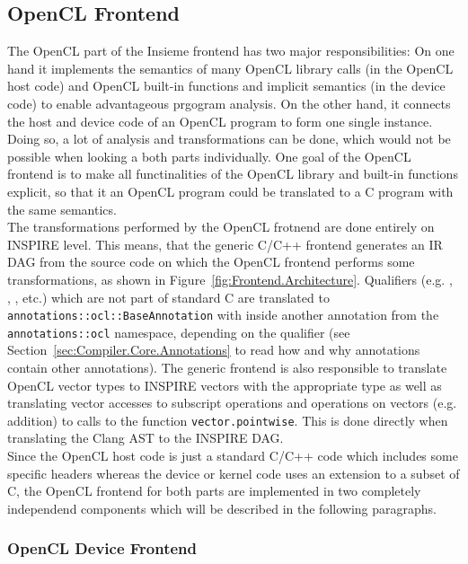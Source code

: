 \subsection{OpenCL Frontend}
\label{sec:Insieme.OpenCL}

The OpenCL part of the Insieme frontend has two major responsibilities: On one hand it implements the semantics of many OpenCL library calls (in the OpenCL host code) and OpenCL built-in functions and implicit semantics (in the device code) to enable advantageous prgogram analysis. On the other hand, it connects the host and device code of an OpenCL program to form one single instance. Doing so, a lot of analysis and transformations can be done, which would not be possible when looking a both parts individually. One goal of the OpenCL frontend is to make all functinalities of the OpenCL library and built-in functions explicit, so that it an OpenCL program could be translated to a C program with the same semantics. \\

The transformations performed by the OpenCL frotnend are done entirely on INSPIRE level. This means, that the generic C/C++ frontend generates an IR DAG from the source code on which the OpenCL frontend performs some transformations, as shown in Figure~\ref{fig:Frontend.Architecture}. Qualifiers (e.g. , , , etc.) which are not part of standard C are translated to \texttt{annotations::ocl::BaseAnnotation} with inside another annotation from the \lstinline|annotations::ocl| namespace, depending on the qualifier (see Section~\ref{sec:Compiler.Core.Annotations} to read how and why annotations contain other annotations). The generic frontend is also responsible to translate OpenCL vector types to INSPIRE vectors with the appropriate type as well as translating vector accesses to subscript operations and operations on vectors (e.g. addition) to calls to the function \texttt{vector.pointwise}. This is done directly when translating the Clang AST to the INSPIRE DAG. \\

Since the OpenCL host code is just a standard C/C++ code which includes some specific headers whereas the device or kernel code uses an extension to a subset of C, the OpenCL frontend for both parts are implemented in two completely independend components which will be described in the following paragraphs. \\


\subsubsection{OpenCL Device Frontend}
\label{sec:Insieme.DeviceCL}

